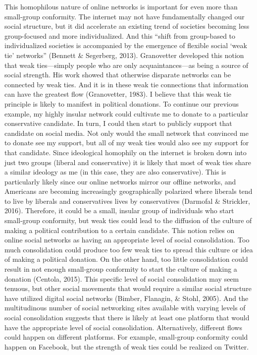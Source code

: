 \documentclass[12pt,]{article}
\begin{document}
This homophilous nature of online networks is important for even more
than small-group conformity. The internet may not have fundamentally
changed our social structure, but it did accelerate an existing trend of
societies becoming less group-focused and more individualized. And this
``shift from group-based to individualized societies is accompanied by
the emergence of flexible social `weak tie' networks'' (Bennett \&
Segerberg, 2013). Granovetter developed this notion that weak
ties---simply people who are only acquaintances---as being a source of
social strength. His work showed that otherwise disparate networks can
be connected by weak ties. And it is in these weak tie connections that
information can have the greatest flow (Granovetter, 1983). I believe
that this weak tie principle is likely to manifest in political
donations. To continue our previous example, my highly insular network
could cultivate me to donate to a particular conservative candidate. In
turn, I could then start to publicly support that candidate on social
media. Not only would the small network that convinced me to donate see
my support, but all of my weak ties would also see my support for that
candidate. Since ideological homophily on the internet is broken down
into just two groups (liberal and conservative) it is likely that most
of weak ties share a similar ideology as me (in this case, they are also
conservative). This is particularly likely since our online networks
mirror our offline networks, and Americans are becoming increasingly
geographically polarized where liberals tend to live by liberals and
conservatives lives by conservatives (Darmofal \& Strickler, 2016).
Therefore, it could be a small, insular group of individuals who start
small-group conformity, but weak ties could lead to the diffusion of the
culture of making a political contribution to a certain candidate. This
notion relies on online social networks as having an appropriate level
of social consolidation. Too much consolidation could produce too few
weak ties to spread this culture or idea of making a political donation.
On the other hand, too little consolidation could result in not enough
small-group conformity to start the culture of making a donation
(Centola, 2015). This specific level of social consolidation may seem
tenuous, but other social movements that would require a similar social
structure have utilized digital social networks (Bimber, Flanagin, \&
Stohl, 2005). And the multitudinous number of social networking sites
available with varying levels of social consolidation suggests that
there is likely at least one platform that would have the appropriate
level of social consolidation. Alternatively, different flows could
happen on different platforms. For example, small-group conformity could
happen on Facebook, but the strength of weak ties could be realized on
Twitter.
\end{document}
